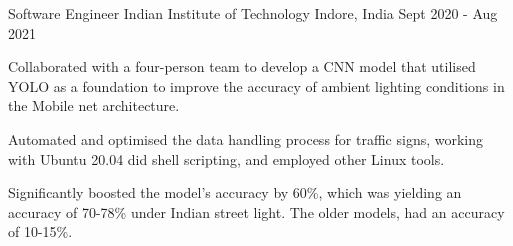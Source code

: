 

\begin{cventries}

  \cventry
    {Software Engineer} %
    {Indian Institute of Technology} %
    {Indore, India} %
    {Sept 2020 - Aug 2021} %
    {
      \begin{cvitems} %
        \item {Collaborated with a four-person team to develop a CNN model that utilised YOLO as a foundation to improve the accuracy of ambient lighting conditions in the Mobile net architecture.}
        \item {Automated and optimised the data handling process for traffic signs, working with Ubuntu 20.04 did shell scripting, and employed other Linux tools.}
        \item {Significantly boosted the model's accuracy by 60\%, which was yielding an accuracy of 70-78\% under Indian street light. The older models, had an accuracy of 10-15\%.}
      \end{cvitems}
    }

\end{cventries}
